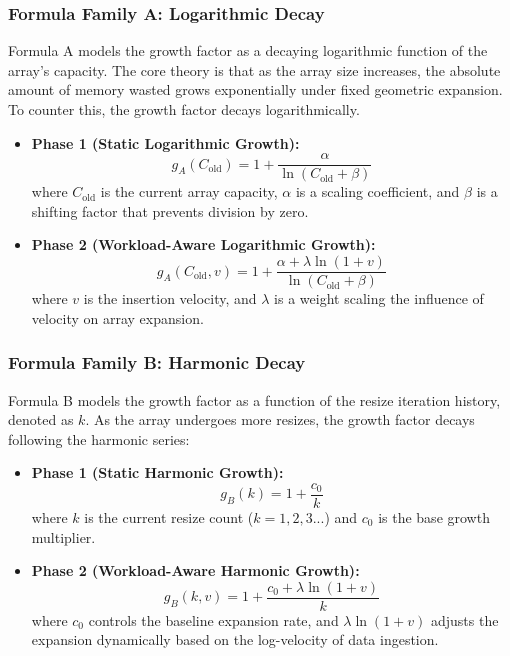\subsubsection{Formula Family A: Logarithmic Decay}
Formula A models the growth factor as a decaying logarithmic function of the 
array's capacity. The core theory is that as the array size increases, the 
absolute amount of memory wasted grows exponentially under fixed geometric 
expansion. To counter this, the growth factor decays logarithmically.
\begin{itemize}
    \item \textbf{Phase 1 (Static Logarithmic Growth):}
    \begin{equation}
        g_A(C_{\text{old}}) = 1 + \frac{\alpha}{\ln(C_{\text{old}} + \beta)}
    \end{equation}
    where $C_{\text{old}}$ is the current array capacity, $\alpha$ is a scaling 
    coefficient, and $\beta$ is a shifting factor that prevents division by zero.
    \item \textbf{Phase 2 (Workload-Aware Logarithmic Growth):}
    \begin{equation}
        g_A(C_{\text{old}}, v) = 1 + \frac{\alpha + \lambda \ln(1 + v)}{\ln(C_{\text{old}} + \beta)}
    \end{equation}
    where $v$ is the insertion velocity, and $\lambda$ is a weight scaling the 
    influence of velocity on array expansion.
\end{itemize}

\subsubsection{Formula Family B: Harmonic Decay}
Formula B models the growth factor as a function of the resize iteration history, 
denoted as $k$. As the array undergoes more resizes, the growth factor decays 
following the harmonic series:
\begin{itemize}
    \item \textbf{Phase 1 (Static Harmonic Growth):}
    \begin{equation}
        g_B(k) = 1 + \frac{c_0}{k}
    \end{equation}
    where $k$ is the current resize count ($k = 1, 2, 3...$) and $c_0$ is the 
    base growth multiplier.
    \item \textbf{Phase 2 (Workload-Aware Harmonic Growth):}
    \begin{equation}
        g_B(k, v) = 1 + \frac{c_0 + \lambda \ln(1 + v)}{k}
    \end{equation}
    where $c_0$ controls the baseline expansion rate, and $\lambda \ln(1+v)$ 
    adjusts the expansion dynamically based on the log-velocity of data 
    ingestion.
\end{itemize}

